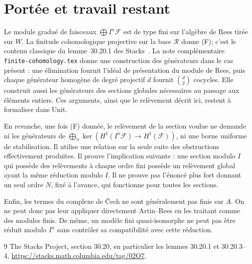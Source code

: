 \documentclass[11pt]{amsart}
\theoremstyle{remark}
\newcommand{\Rees}{\mathcal R}
\newcommand{\F}{\mathcal F}
\begin{document}
\section{Portée et travail restant}

Le module gradué de faisceaux $\bigoplus I^n\F$ est de type fini
sur l'algèbre de Rees tirée sur $W$. La finitude cohomologique
projective sur la base $\Rees$ donne (F); c'est le contenu classique
du lemme~30.20.1 des Stacks~\cite{stacks}. La note complémentaire
\texttt{finite-cohomology.tex} donne une construction des générateurs
dans le cas présent : une élimination fournit l'idéal de présentation
du module de Rees, puis chaque générateur homogène de degré projectif
$d$ fournit $\binom d2$ cocycles. Elle construit aussi les générateurs
des sections globales nécessaires au passage aux éléments entiers.
Ces arguments, ainsi que le relèvement décrit ici, restent à formaliser
dans Unit.

En revanche, une fois (F) donnée, le relèvement de la section voulue
ne demande ni les générateurs de
$\bigoplus_n\ker(H^1(I^n\F)\to H^1(\F))$, ni une borne uniforme
de stabilisation. Il utilise une relation sur la seule suite des
obstructions effectivement produites.
Il prouve l'implication suivante : une section modulo $I$ qui possède
des relèvements à chaque ordre fini possède un relèvement global
ayant la même réduction modulo $I$.
Il ne prouve pas l'énoncé plus fort donnant un seul ordre $N$, fixé
à l'avance, qui fonctionne pour toutes les sections.

Enfin, les termes du complexe de Čech ne sont généralement pas
finis sur $A$. On ne peut donc pas leur appliquer directement
Artin--Rees en les traitant comme des modules finis. De même,
un modèle fini quasi-isomorphe ne peut pas être réduit modulo $I^n$
sans contrôler sa compatibilité avec cette réduction.

\begin{thebibliography}{9}
 The Stacks Project, section 30.20, en particulier
les lemmes 30.20.1 et 30.20.3--4,
\url{https://stacks.math.columbia.edu/tag/02O7}.
\end{thebibliography}
\end{document}
